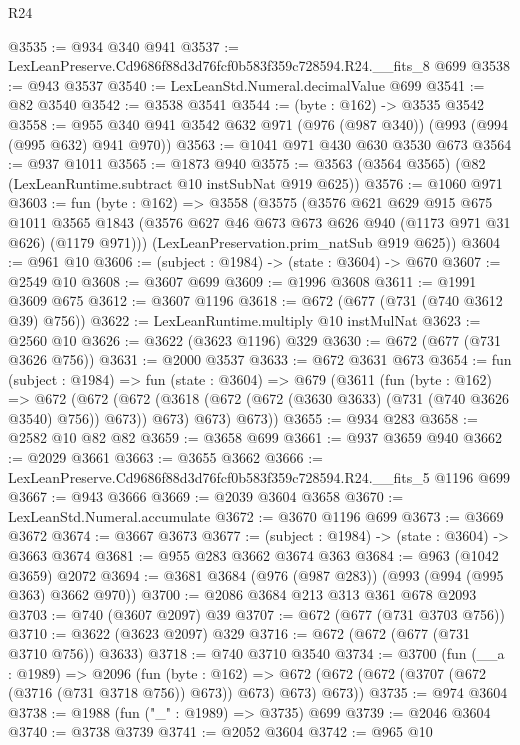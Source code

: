 \begin{lexlean}{R24}
\begin{coremodule}
@3535 := @934 @340 @941
@3537 := LexLeanPreserve.Cd9686f88d3d76fcf0b583f359c728594.R24.__fits_8 @699
@3538 := @943 @3537
@3540 := LexLeanStd.Numeral.decimalValue @699
@3541 := @82 @3540
@3542 := @3538 @3541
@3544 := (byte : @162) -> @3535 @3542
@3558 := @955 @340 @941 @3542 @632 @971 (@976 (@987 @340)) (@993 (@994 (@995 @632) @941 @970))
@3563 := @1041 @971 @430 @630 @3530 @673
@3564 := @937 @1011
@3565 := @1873 @940
@3575 := @3563 (@3564 @3565) (@82 (LexLeanRuntime.subtract @10 instSubNat @919 @625))
@3576 := @1060 @971
@3603 := fun (byte : @162) =>
  @3558
    (@3575
      (@3576
        @621
        @629
        @915
        @675
        @1011
        @3565
        @1843
        (@3576 @627 @46 @673 @673 @626 @940 (@1173 @971 @31 @626) (@1179 @971)))
      (LexLeanPreservation.prim_natSub @919 @625))
@3604 := @961 @10
@3606 := (subject : @1984) -> (state : @3604) -> @670
@3607 := @2549 @10
@3608 := @3607 @699
@3609 := @1996 @3608
@3611 := @1991 @3609 @675
@3612 := @3607 @1196
@3618 := @672 (@677 (@731 (@740 @3612 @39) @756))
@3622 := LexLeanRuntime.multiply @10 instMulNat
@3623 := @2560 @10
@3626 := @3622 (@3623 @1196) @329
@3630 := @672 (@677 (@731 @3626 @756))
@3631 := @2000 @3537
@3633 := @672 @3631 @673
@3654 := fun (subject : @1984) =>
  fun (state : @3604) =>
  @679
    (@3611
      (fun (byte : @162) =>
      @672
        (@672
          (@672 (@3618 (@672 (@672 (@3630 @3633) (@731 (@740 @3626 @3540) @756)) @673)) @673)
          @673)
        @673))
@3655 := @934 @283
@3658 := @2582 @10 @82 @82
@3659 := @3658 @699
@3661 := @937 @3659 @940
@3662 := @2029 @3661
@3663 := @3655 @3662
@3666 := LexLeanPreserve.Cd9686f88d3d76fcf0b583f359c728594.R24.__fits_5 @1196 @699
@3667 := @943 @3666
@3669 := @2039 @3604 @3658
@3670 := LexLeanStd.Numeral.accumulate
@3672 := @3670 @1196 @699
@3673 := @3669 @3672
@3674 := @3667 @3673
@3677 := (subject : @1984) -> (state : @3604) -> @3663 @3674
@3681 := @955 @283 @3662 @3674 @363
@3684 := @963 (@1042 @3659) @2072
@3694 := @3681 @3684 (@976 (@987 @283)) (@993 (@994 (@995 @363) @3662 @970))
@3700 := @2086 @3684 @213 @313 @361 @678 @2093
@3703 := @740 (@3607 @2097) @39
@3707 := @672 (@677 (@731 @3703 @756))
@3710 := @3622 (@3623 @2097) @329
@3716 := @672 (@672 (@677 (@731 @3710 @756)) @3633)
@3718 := @740 @3710 @3540
@3734 := @3700
    (fun (__a : @1989) =>
    @2096
      (fun (byte : @162) =>
      @672 (@672 (@672 (@3707 (@672 (@3716 (@731 @3718 @756)) @673)) @673) @673) @673))
@3735 := @974 @3604
@3738 := @1988 (fun ("_" : @1989) => @3735) @699
@3739 := @2046 @3604
@3740 := @3738 @3739
@3741 := @2052 @3604
@3742 := @965 @10

\end{coremodule}
\end{lexlean}

